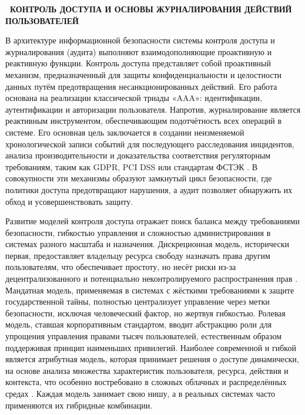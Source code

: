\documentclass{SibFU-docs}
\begin{document}
\newpage
{}
\begin{center}\textbf{\thesection\ КОНТРОЛЬ ДОСТУПА И ОСНОВЫ ЖУРНАЛИРОВАНИЯ ДЕЙСТВИЙ ПОЛЬЗОВАТЕЛЕЙ}\end{center}
\vspace*{-1.5em}

В архитектуре информационной безопасности системы контроля доступа и журналирования (аудита) выполняют взаимодополняющие проактивную и реактивную функции. Контроль доступа представляет собой проактивный механизм, предназначенный для защиты конфиденциальности и целостности данных путём предотвращения несанкционированных действий. Его работа основана на реализации классической триады «AAA»: идентификации, аутентификации и авторизации пользователя. Напротив, журналирование является реактивным инструментом, обеспечивающим подотчётность всех операций в системе. Его основная цель заключается в создании неизменяемой хронологической записи событий для последующего расследования инцидентов, анализа производительности и доказательства соответствия регуляторным требованиям, таким как GDPR, PCI DSS или стандартам ФСТЭК \cite{Stallings2018, Peltier2016}. В совокупности эти механизмы образуют замкнутый цикл безопасности, где политики доступа предотвращают нарушения, а аудит позволяет обнаружить их обход и усовершенствовать защиту.


Развитие моделей контроля доступа отражает поиск баланса между требованиями безопасности, гибкостью управления и сложностью администрирования в системах разного масштаба и назначения. Дискреционная модель, исторически первая, предоставляет владельцу ресурса свободу назначать права другим пользователям, что обеспечивает простоту, но несёт риски из-за децентрализованного и потенциально неконтролируемого распространения прав \cite{Tanenbaum2006}. Мандатная модель, применяемая в системах с жёсткими требованиями к защите государственной тайны, полностью централизует управление через метки безопасности, исключая человеческий фактор, но жертвуя гибкостью. Ролевая модель, ставшая корпоративным стандартом, вводит абстракцию роли для упрощения управления правами тысяч пользователей, естественным образом поддерживая принцип наименьших привилегий. Наиболее современной и гибкой является атрибутная модель, которая принимает решения о доступе динамически, на основе анализа множества характеристик пользователя, ресурса, действия и контекста, что особенно востребовано в сложных облачных и распределённых средах \cite{Stallings2018}. Каждая модель занимает свою нишу, а в реальных системах часто применяются их гибридные комбинации.
\end{document}

